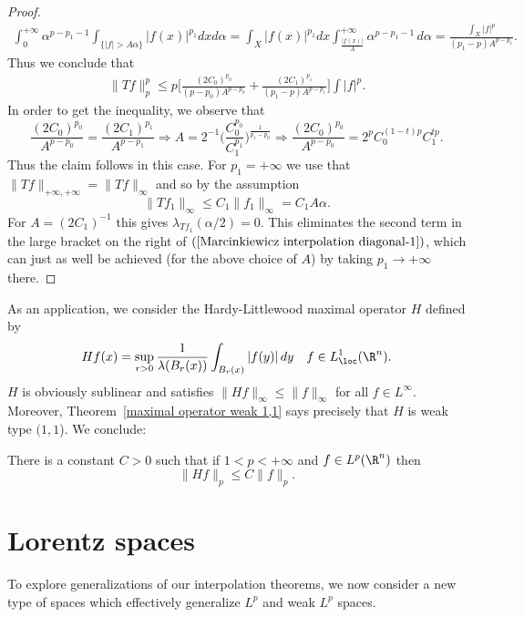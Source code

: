 \begin{proof}
\begin{align*}
\int_{0}^{+\infty}\alpha^{p-p_1-1}\int_{\{|f|>A\alpha\}}|f(x)|^{p_1}dx d\alpha=\int_{X}|f(x)|^{p_1}dx\int_{\frac{|f(x)|}{A}}^{+\infty}\alpha^{p-p_1-1}\,d\alpha=\frac{\int_X|f|^{p}}{(p_1-p)A^{p-p_1}}.
\end{align*}
Thus we conclude that
\begin{align}\label{Marcinkiewicz interpolation diagonal-1}
\|Tf\|_{p}^{p}\leq p\Big[\frac{(2C_0)^{p_0}}{(p-p_0)A^{p-p_0}}+\frac{(2C_1)^{p_1}}{(p_1-p)A^{p-p_1}}\Big]\int|f|^{p}.
\end{align}
In order to get the inequality, we observe that
\[\frac{(2C_0)^{p_0}}{A^{p-p_0}}=\frac{(2C_1)^{p_1}}{A^{p-p_1}}\Longrightarrow A=2^{-1}\Big(\frac{C_0^{p_0}}{C_1^{p_1}}\Big)^{\frac{1}{p_1-p_0}}\Longrightarrow \frac{(2C_0)^{p_0}}{A^{p-p_0}}=2^{p}C_0^{(1-t)p}C_1^{tp}.\]
Thus the claim follows in this case. For $p_1=+\infty$ we use that $\|Tf\|_{+\infty,+\infty}=\|Tf\|_\infty$ and so by the assumption
\[\|Tf_1\|_\infty\leq C_1\|f_1\|_\infty=C_1A\alpha.\]
For $A=(2C_1)^{-1}$ this gives $\lambda_{Tf_1}(\alpha/2)=0$. This eliminates the second term in the large bracket on the right of $(\ref{Marcinkiewicz interpolation diagonal-1})$, which can just as well be achieved (for the above choice of $A$) by taking $p_1\to+\infty$ there.
\end{proof}
As an application, we consider the Hardy-Littlewood maximal operator $H$ defined by
\[Hf(x)=\sup_{r>0}\frac{1}{\lambda(B_r(x))}\int_{B_r(x)}|f(y)|\,dy\quad f\in L^1_{\loc}(\R^n).\]
$H$ is obviously sublinear and satisfies $\|Hf\|_{\infty}\leq\|f\|_\infty$ for all $f\in L^\infty$. Moreover, Theorem~\ref{maximal operator weak 1,1} says precisely that $H$ is weak type $(1,1$). We conclude:
\begin{corollary}
There is a constant $C>0$ such that if $1<p<+\infty$ and $f\in L^p(\R^n)$ then
\[\|Hf\|_p\leq C\|f\|_p.\]
\end{corollary}
\section{Lorentz spaces}
To explore generalizations of our interpolation theorems, we now consider a new type of spaces which effectively generalize $L^p$ and weak $L^p$ spaces.
